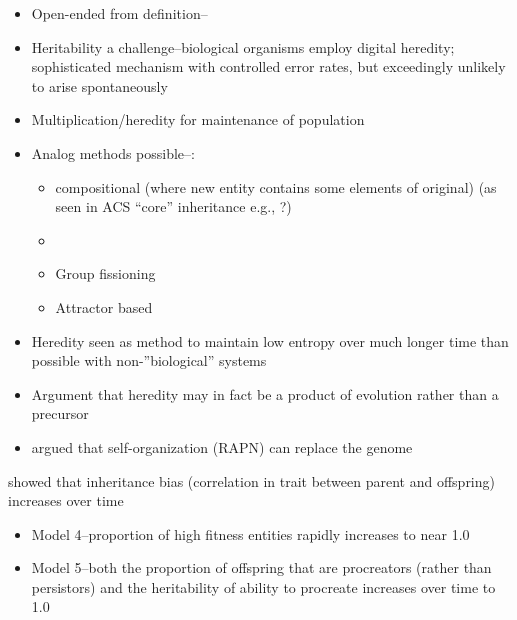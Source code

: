 \begin{itemize}
	\item
	      Open-ended from \autocite{MaynardSmith1999} definition--
	\item
	      Heritability a challenge--biological organisms employ digital
	      heredity; sophisticated mechanism with controlled error rates, but
	      exceedingly unlikely to arise spontaneously
	\item
	      Multiplication/heredity for maintenance of population
	\item
	      Analog methods possible--\eg:
	      	
	      \begin{itemize}
	      	\item
	      	      compositional (where new entity contains some elements of original)
	      	      (as seen in ACS ``core'' inheritance e.g., \autocite{Vasas2015, Watson2012}?)
	      	\item
	      	\item
	      	      Group fissioning \autocite{Watson2015}
	      	\item
	      	      Attractor based \autocite{Szathmary2000}
	      \end{itemize}
	\item
	      Heredity seen as method to maintain low entropy over much longer time
	      than possible with non-''biological'' systems \autocite{Adami2015}
	\item
	      Argument that heredity may in fact be a product of evolution rather than a precursor \autocite{Bourrat2015}
	\item
	      \autocite{Kauffman:1993kk} argued that self-organization (RAPN) can replace the genome
\end{itemize}

\autocite{Bourrat2015} showed that inheritance bias (correlation in trait between parent and offspring) increases over time

\begin{itemize}
	\item
	      Model 4--proportion of high fitness entities rapidly increases to
	      near 1.0
	\item
	      Model 5--both the proportion of offspring that are procreators
	      (rather than persistors) and the heritability of ability to procreate
	      increases over time to 1.0
\end{itemize}


